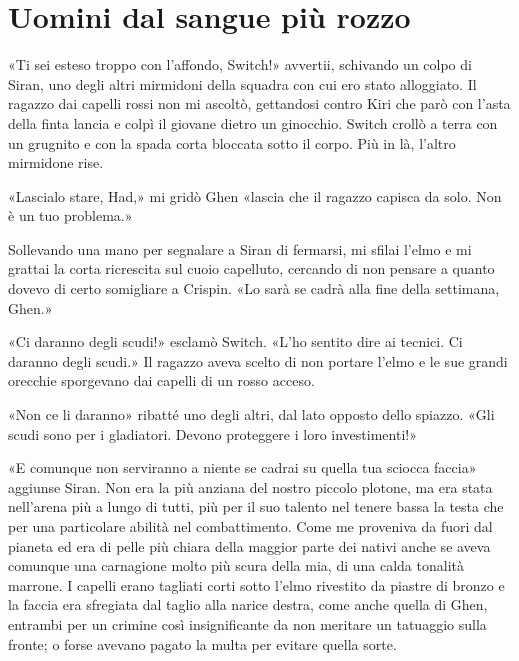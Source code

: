 \chapter{Uomini dal sangue più rozzo}

«Ti sei esteso troppo con l'affondo, Switch!» avvertii, schivando un
colpo di Siran, uno degli altri mirmidoni della squadra con cui ero
stato alloggiato. Il ragazzo dai capelli rossi non mi ascoltò,
gettandosi contro Kiri che parò con l'asta della finta lancia e colpì il
giovane dietro un ginocchio. Switch crollò a terra con un grugnito e con
la spada corta bloccata sotto il corpo. Più in là, l'altro mirmidone
rise.

«Lascialo stare, Had,» mi gridò Ghen «lascia che il ragazzo capisca da
solo. Non è un tuo problema.»

Sollevando una mano per segnalare a Siran di fermarsi, mi sfilai l'elmo
e mi grattai la corta ricrescita sul cuoio capelluto, cercando di non
pensare a quanto dovevo di certo somigliare a Crispin. «Lo sarà se cadrà
alla fine della settimana, Ghen.»

«Ci daranno degli scudi!» esclamò Switch. «L'ho sentito dire ai tecnici.
Ci daranno degli scudi.» Il ragazzo aveva scelto di non portare l'elmo e
le sue grandi orecchie sporgevano dai capelli di un rosso acceso.

«Non ce li daranno» ribatté uno degli altri, dal lato opposto dello
spiazzo. «Gli scudi sono per i gladiatori. Devono proteggere i loro
investimenti!»

«E comunque non serviranno a niente se cadrai su quella tua sciocca
faccia» aggiunse Siran. Non era la più anziana del nostro piccolo
plotone, ma era stata nell'arena più a lungo di tutti, più per il suo
talento nel tenere bassa la testa che per una particolare abilità nel
combattimento. Come me proveniva da fuori dal pianeta ed era di pelle
più chiara della maggior parte dei nativi anche se aveva comunque una
carnagione molto più scura della mia, di una calda tonalità marrone. I
capelli erano tagliati corti sotto l'elmo rivestito da piastre di bronzo
e la faccia era sfregiata dal taglio alla narice destra, come anche
quella di Ghen, entrambi per un crimine così insignificante da non
meritare un tatuaggio sulla fronte; o forse avevano pagato la multa per
evitare quella sorte.

